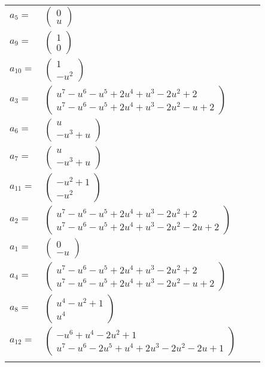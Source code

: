 \documentclass[1p]{elsarticle_modified}
\theoremstyle{definition}
\begin{document}
\begin{tabular}{m{7pt} m{180pt} m{7pt} m{180pt} }
\flushright $a_{5}=$&$\begin{pmatrix}0\\u\end{pmatrix}$ \\
\flushright $a_{9}=$&$\begin{pmatrix}1\\0\end{pmatrix}$ \\
\flushright $a_{10}=$&$\begin{pmatrix}1\\- u^2\end{pmatrix}$ \\
\flushright $a_{3}=$&$\begin{pmatrix}u^7- u^6- u^5+2 u^4+u^3-2 u^2+2\\u^7- u^6- u^5+2 u^4+u^3-2 u^2- u+2\end{pmatrix}$ \\
\flushright $a_{6}=$&$\begin{pmatrix}u\\- u^3+u\end{pmatrix}$ \\
\flushright $a_{7}=$&$\begin{pmatrix}u\\- u^3+u\end{pmatrix}$ \\
\flushright $a_{11}=$&$\begin{pmatrix}- u^2+1\\- u^2\end{pmatrix}$ \\
\flushright $a_{2}=$&$\begin{pmatrix}u^7- u^6- u^5+2 u^4+u^3-2 u^2+2\\u^7- u^6- u^5+2 u^4+u^3-2 u^2-2 u+2\end{pmatrix}$ \\
\flushright $a_{1}=$&$\begin{pmatrix}0\\- u\end{pmatrix}$ \\
\flushright $a_{4}=$&$\begin{pmatrix}u^7- u^6- u^5+2 u^4+u^3-2 u^2+2\\u^7- u^6- u^5+2 u^4+u^3-2 u^2- u+2\end{pmatrix}$ \\
\flushright $a_{8}=$&$\begin{pmatrix}u^4- u^2+1\\u^4\end{pmatrix}$ \\
\flushright $a_{12}=$&$\begin{pmatrix}- u^6+u^4-2 u^2+1\\u^7- u^6-2 u^5+u^4+2 u^3-2 u^2-2 u+1\end{pmatrix}$\\&\end{tabular}
\end{document}

